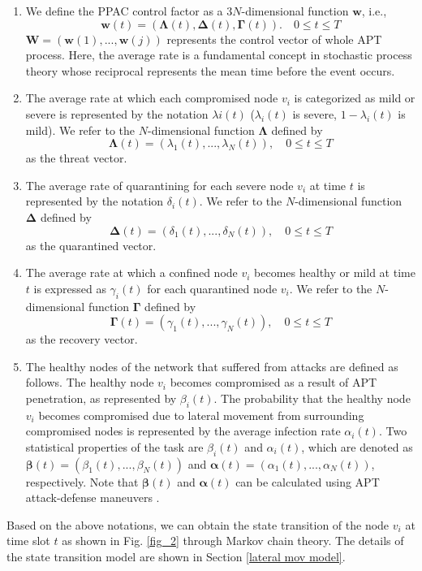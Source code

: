 \documentclass[lettersize,journal]{IEEEtran}
\begin{document}
 \begin{enumerate}
     \item We define the PPAC control factor as a $3N$-dimensional function $\bm{w}$, i.e.,
    \begin{equation}
    \label{eq_w}
    \bm{w}(t)=(\mathbf{\Lambda}(t),\mathbf{\Delta}(t),\mathbf{\Gamma}(t)). \quad 0\leq t\leq T
    \end{equation}
     $\bm{W}=(\bm{w}(1),...,\bm{w}(j))$ represents the control vector of whole APT process. Here, the average rate is a fundamental concept in stochastic process theory \cite{stewart2021introduction} whose reciprocal represents the mean time before the event occurs.
      \item The average rate at which each compromised node $v_i$ is categorized as mild or severe is represented by the notation $\lambda i(t)$ ($\lambda_i(t)$ is severe, $1-\lambda_i(t)$ is mild). We refer to the $N$-dimensional function $\mathbf{\Lambda}$ defined by
\begin{equation}
\label{eq_lambda}
\bm{\Lambda}(t)=(\lambda_1(t),...,\lambda_N(t)), \quad 0\leq t\leq T
\end{equation}
as the threat vector.
      \item The average rate of quarantining for each severe node $v_i$ at time $t$ is represented by the notation $\delta_i(t)$. We refer to the $N$-dimensional function $\mathbf{\Delta}$ defined by
\begin{equation}
\label{eq_delta}
\bm{\Delta}(t)=(\delta_1(t),...,\delta_N(t)), \quad 0\leq t\leq T
\end{equation}
as the quarantined vector.
\item The average rate at which a confined node $v_i$ becomes healthy or mild at time $t$ is expressed as $\gamma_i(t)$ for each quarantined node $v_i$. We refer to the $N$-dimensional function $\mathbf{\Gamma}$ defined by
\begin{equation}
\label{eq_gamma}
\bm{\Gamma}(t)=(\gamma_1(t),...,\gamma_N(t)), \quad 0\leq t\leq T
\end{equation}
as the recovery vector.
     \item The healthy nodes of the network that suffered from attacks are defined as follows. The healthy node $v_i$ becomes compromised as a result of APT penetration, as represented by $\beta_i(t)$. The probability that the healthy node $v_i$ becomes compromised due to lateral movement from surrounding compromised nodes is represented by the average infection rate $\alpha_i(t)$. Two statistical properties of the task are $\beta_i(t)$ and $\alpha_i(t)$, which are denoted as $\bm{\beta}(t)=(\beta_1(t),...,\beta_N(t))$ and $\bm{\alpha}(t)=(\alpha_1(t),...,\alpha_N(t))$, respectively. Note that $\bm{\beta}(t)$ and $\bm{\alpha}(t)$ can be calculated using APT attack-defense maneuvers \cite{diogenes2018cybersecurity}. 
  \end{enumerate} 
  \par
  Based on the above notations, we can obtain the state transition of the node $v_i$ at time slot $t$ as shown in Fig. \ref{fig_2} through Markov chain theory. The details of the state transition model are shown in Section \ref{lateral mov model}.
\end{document}
